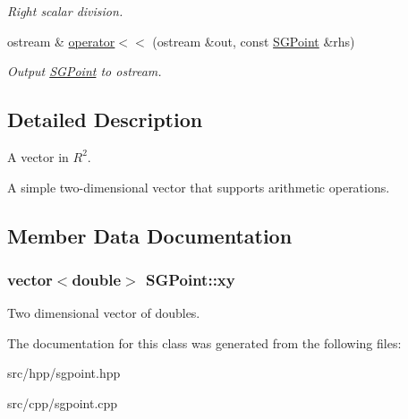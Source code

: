 \begin{DoxyCompactItemize}
\begin{DoxyCompactList}\small\item\em Right scalar division. \end{DoxyCompactList}\item 
\hypertarget{class_s_g_point_a574625ffb8acdf3d4fbd94e9c8bac123}{ostream \& \hyperlink{class_s_g_point_a574625ffb8acdf3d4fbd94e9c8bac123}{operator$<$$<$} (ostream \&out, const \hyperlink{class_s_g_point}{S\+G\+Point} \&rhs)}\label{class_s_g_point_a574625ffb8acdf3d4fbd94e9c8bac123}

\begin{DoxyCompactList}\small\item\em Output \hyperlink{class_s_g_point}{S\+G\+Point} to ostream. \end{DoxyCompactList}\end{DoxyCompactItemize}


\subsection{Detailed Description}
A vector in $R^2$. 

A simple two-\/dimensional vector that supports arithmetic operations. 

\subsection{Member Data Documentation}
\hypertarget{class_s_g_point_a3ad7a78283a2797a567575a2a5c3200e}{
\subsubsection[{xy}]{\setlength{\rightskip}{0pt plus 5cm}vector$<$double$>$ S\+G\+Point\+::xy\hspace{0.3cm}{\ttfamily [protected]}}}\label{class_s_g_point_a3ad7a78283a2797a567575a2a5c3200e}
Two dimensional vector of doubles. 

The documentation for this class was generated from the following files\+:\begin{DoxyCompactItemize}
\item 
src/hpp/sgpoint.\+hpp\item 
src/cpp/sgpoint.\+cpp\end{DoxyCompactItemize}
